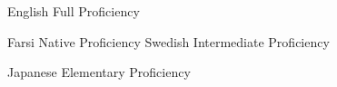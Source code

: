 
\begin{cvskills}

  \cvskill
    {English} %
    {Full Proficiency} %

  \cvskill
    {Farsi} %
    {Native Proficiency} %
  \cvskill
    {Swedish} %
    {Intermediate Proficiency} %

  \cvskill
    {Japanese} %
    {Elementary Proficiency} %
    
\end{cvskills}
